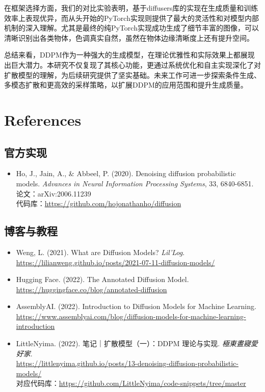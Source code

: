 \documentclass{ctexart}
\begin{document}
\noindent
在框架选择方面，我们的对比实验表明，基于diffusers库的实现在生成质量和训练效率上表现优异，而从头开始的PyTorch实现则提供了最大的灵活性和对模型内部机制的深入理解。尤其是最终的纯PyTorch实现成功生成了细节丰富的图像，可以清晰识别出各类物体，色调真实自然，虽然在物体边缘清晰度上还有提升空间。

\noindent
总结来看，DDPM作为一种强大的生成模型，在理论优雅性和实际效果上都展现出巨大潜力。本研究不仅复现了其核心功能，更通过系统优化和自主实现深化了对扩散模型的理解，为后续研究提供了坚实基础。未来工作可进一步探索条件生成、多模态扩散和更高效的采样策略，以扩展DDPM的应用范围和提升生成质量。

\section{References}

\subsection{官方实现}
\begin{itemize}
    \item Ho, J., Jain, A., \& Abbeel, P. (2020). Denoising diffusion probabilistic models. \textit{Advances in Neural Information Processing Systems}, 33, 6840-6851.\\
    论文：arXiv:2006.11239 \\
    代码库：\url{https://github.com/hojonathanho/diffusion}
\end{itemize}

\subsection{博客与教程}
\begin{itemize}
    \item Weng, L. (2021). What are Diffusion Models? \textit{Lil'Log}. \\
    \url{https://lilianweng.github.io/posts/2021-07-11-diffusion-models/}
    
    \item Hugging Face. (2022). The Annotated Diffusion Model. \\
    \url{https://huggingface.co/blog/annotated-diffusion}
    
    \item AssemblyAI. (2022). Introduction to Diffusion Models for Machine Learning. \\
    \url{https://www.assemblyai.com/blog/diffusion-models-for-machine-learning-introduction}
    
    \item LittleNyima. (2022). 笔记｜扩散模型（一）：DDPM 理论与实现. \textit{極東晝寢愛好家}. \\
    \url{https://littlenyima.github.io/posts/13-denoising-diffusion-probabilistic-models/} \\
    对应代码库：\url{https://github.com/LittleNyima/code-snippets/tree/master}
\end{itemize}
\end{document}
